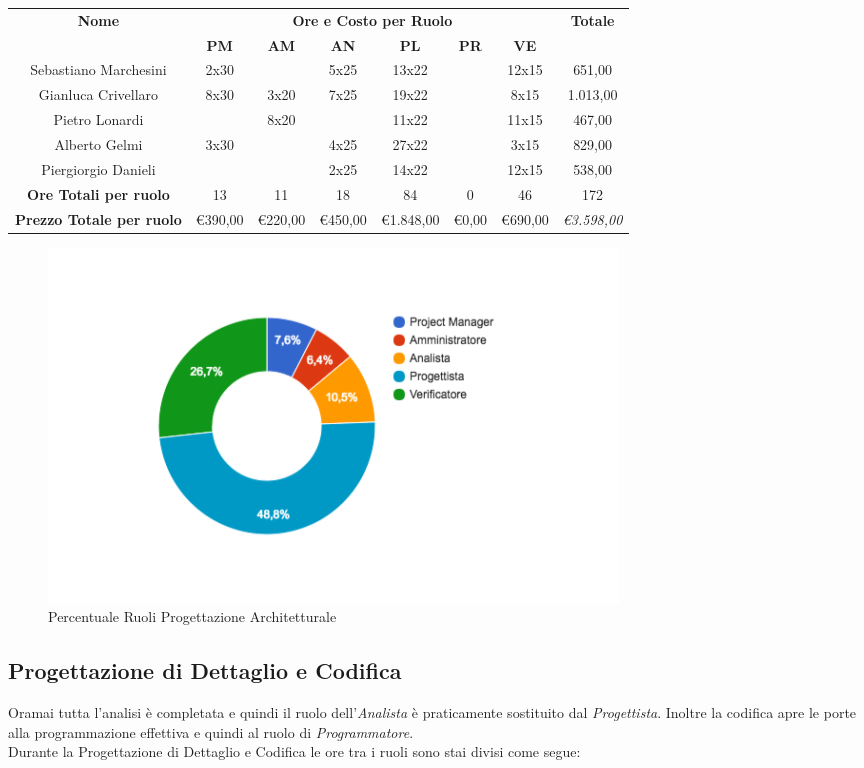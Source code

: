 \documentclass[12pt,a4paper,titlepage]{article}
\begin{document}
	{\renewcommand\arraystretch{1.2} %
		\small
		\begin{tabular}{|c|c|c|c|c|c|c|c|}
			\hline 
			\textbf{Nome} & \multicolumn{6}{c|}{\textbf{Ore e Costo per Ruolo}} & \textbf{Totale} \\ 
			& \textbf{PM} & \textbf{AM} & \textbf{AN} & \textbf{PL} & \textbf{PR} & \textbf{VE} & \textbf{} \\ 
			\hline 
			Sebastiano Marchesini & 2x30 & & 5x25 & 13x22 & & 12x15 & 651,00 \\ 
			\hline 
			Gianluca Crivellaro & 8x30 & 3x20 & 7x25 & 19x22 & & 8x15 & 1.013,00 \\ 
			\hline 
			Pietro Lonardi & & 8x20 & & 11x22 & & 11x15 & 467,00 \\ 
			\hline 
			Alberto Gelmi & 3x30 & & 4x25 & 27x22 & & 3x15 & 829,00 \\ 
			\hline 
			Piergiorgio Danieli & & & 2x25 & 14x22 & & 12x15 & 538,00 \\ 
			\hline
			\hline
			\textbf{Ore Totali per ruolo} & 13 & 11 & 18 & 84 & 0 & 46 & 172 \\  
			\textbf{Prezzo Totale per ruolo}&\euro 390,00&\euro 220,00&\euro 450,00&\euro 1.848,00&\euro 0,00&\euro 690,00& \textit{\euro 3.598,00} \\
			\hline 
	\end{tabular}} 

	\begin{figure}[p]
		\centering
		\includegraphics[width=0.7\linewidth]{"CiambellaProgettazione"}
		\caption{Percentuale Ruoli Progettazione Architetturale}
		\label{fig:ciambella-progettazione-architetturale}
	\end{figure} 

	
	\subsection{Progettazione di Dettaglio e Codifica}
	Oramai tutta l'analisi è completata e quindi il ruolo dell'\textit{Analista} è praticamente sostituito dal \textit{Progettista}. Inoltre la codifica apre le porte alla programmazione effettiva e quindi al ruolo di \textit{Programmatore}.\\
	Durante la Progettazione di Dettaglio e Codifica le ore tra i ruoli sono stai divisi come segue:
	\\
	
\end{document}
